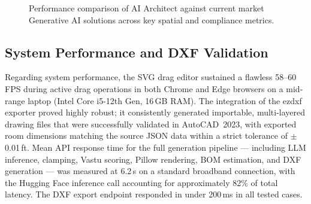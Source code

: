 \documentclass[10pt, twocolumn, letterpaper]{article}
\begin{document}
\begin{figure}[ht]
  \centering
  \caption{Performance comparison of AI Architect against current market Generative AI solutions across key spatial and compliance metrics.}
  \label{fig:comparison_graph}
\end{figure}

\subsection{System Performance and DXF Validation}

Regarding system performance, the SVG drag editor sustained a flawless 58--60\,FPS
during active drag operations in both Chrome and Edge browsers on a mid-range
laptop (Intel Core i5-12th Gen, 16\,GB RAM). The integration of the ezdxf
exporter proved highly robust; it consistently generated importable,
multi-layered drawing files that were successfully validated in AutoCAD~2023,
with exported room dimensions matching the source JSON data within a strict
tolerance of $\pm$0.01\,ft. Mean API response time for the full generation
pipeline --- including LLM inference, clamping, Vastu scoring, Pillow
rendering, BOM estimation, and DXF generation --- was measured at 6.2\,s on a standard
broadband connection, with the Hugging Face inference call accounting for
approximately 82\% of total latency. The DXF export endpoint responded in
under 200\,ms in all tested cases.
\end{document}
